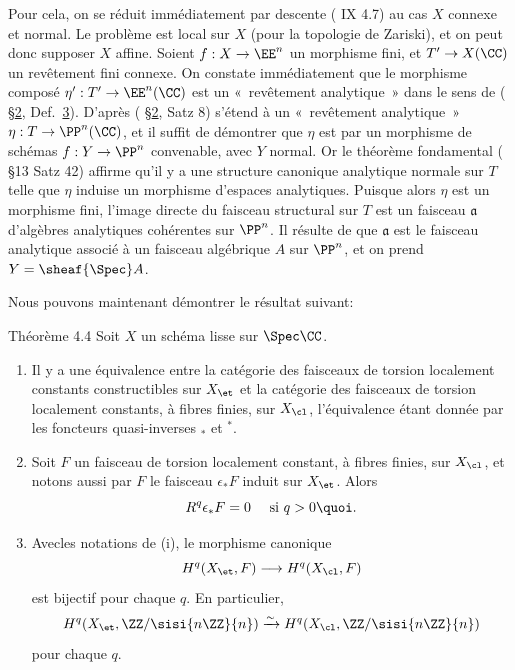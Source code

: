 \documentclass[10pt]{../fichiers-configuration-latex/smfart}
\begin{document}
Pour cela, on se réduit immédiatement par descente ( IX 4.7) au %
cas $X$ connexe et normal. Le problème est local sur $X$ (pour la
topologie de Zariski), et on peut donc supposer $X$ affine. Soient
$f:X\rightarrow \EE^n$ un morphisme fini, et $T'\rightarrow
X(\CC)$ un revêtement fini connexe. On constate immédiatement
que le morphisme composé $\eta':T'\rightarrow
\EE^n(\CC)$ est un « revêtement analytique » dans
le sens de (\cite{2} \S \hyperref[XI.sec2]{2}, Def.~\hyperref[XI.sec3]{3}). 
D'après (\cite{2} \S \hyperref[XI.sec2]{2}, Satz 8)  s'étend à un
« revêtement analytique » $\eta:T\rightarrow
\PP^n(\CC)$, et il suffit de démontrer que $\eta$ est
 par un morphisme de schémas $f:Y\rightarrow \PP^n$
convenable, avec $Y$ normal. Or le théorème fondamental (\cite{2} \S 13
Satz 42) affirme qu'il y a une structure canonique analytique normale
sur $T$ telle que $\eta$ induise un morphisme d'espaces
analytiques. Puisque alors $\eta$ est un morphisme fini, l'image
directe du faisceau structural sur $T$ est un faisceau $\mathfrak{a}$
d'algèbres analytiques cohérentes sur $\PP^n$. Il résulte de
 \cite{4} %
que $\mathfrak{a}$ est le faisceau analytique associé à un
faisceau algébrique $A$ sur $\PP^n$, et on prend
$Y=\sheaf{\Spec}A$.

Nous pouvons maintenant démontrer le résultat suivant:

\begin{enonce*}{Théorème 4.4}
Soit $X$ un schéma lisse sur $\Spec \CC$.
\begin{enumerate}
\renewcommand{\theenumi}{\roman{enumi}}
\renewcommand{\labelenumi}{(\theenumi)}
\item Il y a une équivalence entre la catégorie des faisceaux de
  torsion localement constants constructibles sur $X_{\et}$ et la
  catégorie des faisceaux de torsion localement constants, à fibres
  finies, sur $X_{\cl}$, l'équivalence étant donnée par les foncteurs
  quasi-inverses ${}_{\ast}$ et ${}^{\ast}$.

\item Soit $F$ un faisceau de torsion localement constant, à fibres
  finies, sur $X_{\cl}$, et notons aussi par $F$ le faisceau
  $\epsilon_{\ast}F$ induit sur $X_{\et}$. Alors
$$
R^q\epsilon_{\ast}F=0\quad \mbox{ si } q>0{\quoi}.
$$

\item Avec\pageoriginale les notations de {\rm(i)}, le morphisme
  canonique
$$
H^q(X_{\et},F)\longrightarrow H^q(X_{\cl},F)
$$
est bijectif pour chaque $q$. En particulier,
$$
H^q(X_{\et}, \ZZ/\sisi{n\ZZ}{n})\xrightarrow{\sim} H^q(X_{\cl},\ZZ/\sisi{n\ZZ}{n})
$$
pour chaque $q$.
\end{enumerate}
\end{enonce*}
\end{document}
